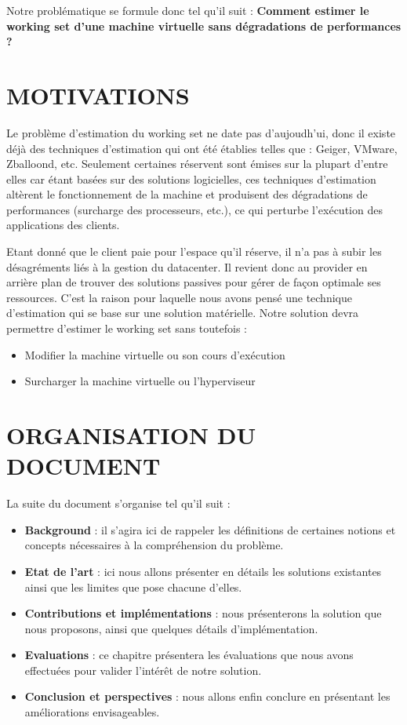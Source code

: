 Notre problématique se formule donc tel qu'il suit : \textbf{Comment estimer le working set d'une machine virtuelle sans dégradations de performances ?}

\section*{MOTIVATIONS}

Le problème d'estimation du working set ne date pas d'aujoudh'ui, donc il existe déjà des techniques d'estimation qui ont été établies telles que : Geiger, VMware, Zballoond, etc. Seulement certaines réservent sont émises sur la plupart d'entre elles car étant basées sur des solutions logicielles, ces techniques d'estimation altèrent le fonctionnement de la machine et produisent des dégradations de performances (surcharge des processeurs, etc.), ce qui perturbe l'exécution des applications des clients.
\par\noindent Etant donné que le client paie pour l'espace qu'il réserve, il n'a 
pas à subir les désagréments liés à la gestion du datacenter. Il revient donc au provider en arrière plan de trouver des solutions passives pour gérer de façon optimale ses ressources. C'est la raison pour laquelle nous avons pensé une technique d'estimation qui se base sur une solution matérielle. Notre solution devra permettre d'estimer le working set sans toutefois : 
\begin{itemize}[label=, font=\large \color{darkorange}]
    \item Modifier la machine virtuelle ou son cours d'exécution
    \item Surcharger la machine virtuelle ou l'hyperviseur
\end{itemize}

\section*{ORGANISATION DU DOCUMENT}
La suite du document s'organise tel qu'il suit : 
\begin{itemize}[label=, font=\large \color{darkorange}]
    \item \textbf{Background} : il s'agira ici de rappeler les définitions de certaines notions et concepts nécessaires à la compréhension du problème.
    \item \textbf{Etat de l'art} : ici nous allons présenter en détails les solutions existantes ainsi que les limites que pose chacune d'elles.
    \item \textbf{Contributions et implémentations} : nous présenterons la solution que nous proposons, ainsi que quelques détails d’implémentation.
    \item \textbf{Evaluations} : ce chapitre présentera les évaluations que nous avons effectuées pour valider l’intérêt de notre solution.
    \item \textbf{Conclusion et perspectives } : nous allons enfin conclure en présentant les améliorations envisageables.
\end{itemize}

